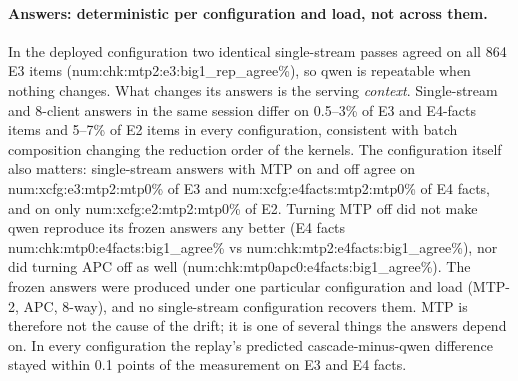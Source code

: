 \documentclass[11pt]{article}
\newcommand{\N}[1]{\csname num:#1\endcsname}
\begin{document}
\begin{table}[t]
\centering
\small
\setlength{\tabcolsep}{4pt}
\resizebox{\textwidth}{!}{}
\caption{The live check under three qwen serving configurations. \emph{qwen alone}: mean
single-stream latency (ms); share of items on which it reproduces its frozen answer (``repro'');
agreement of its own single-stream and 8-client answers in the same session ($c1{=}c8$), and of two
identical single-stream passes ($c1{=}c1$, E3 only). $\Delta$: cascade minus qwen, predicted and
measured. Speed-up: qwen-alone over cascade mean latency at $c=1$, predicted by the replay (with
that configuration's service times) and measured. Gain: cascade over qwen-alone throughput at $c=8$.}
\label{tab:ablation}
\end{table}

\paragraph{Answers: deterministic per configuration and load, not across them.} In the deployed
configuration two identical single-stream passes agreed on all 864 E3 items
(\N{chk:mtp2:e3:big1_rep_agree}\%), so qwen is repeatable when nothing changes. What changes its
answers is the serving \emph{context}. Single-stream and 8-client answers in the same session differ
on 0.5--3\% of E3 and E4-facts items and 5--7\% of E2 items in every configuration, consistent with
batch composition changing the reduction order of the kernels. The configuration itself also matters: single-stream answers with MTP on and off
agree on \N{xcfg:e3:mtp2:mtp0}\% of E3 and \N{xcfg:e4facts:mtp2:mtp0}\% of E4 facts, and on only
\N{xcfg:e2:mtp2:mtp0}\% of E2. Turning MTP off did not make qwen reproduce its frozen answers any
better (E4 facts \N{chk:mtp0:e4facts:big1_agree}\% vs \N{chk:mtp2:e4facts:big1_agree}\%), nor did
turning APC off as well (\N{chk:mtp0apc0:e4facts:big1_agree}\%). The frozen answers were produced
under one particular configuration and load (MTP-2, APC, 8-way), and no single-stream configuration
recovers them. MTP is therefore not the cause of the drift; it is one of several things the answers
depend on. In every configuration the replay's predicted cascade-minus-qwen difference stayed within
0.1 points of the measurement on E3 and E4 facts.
\end{document}

